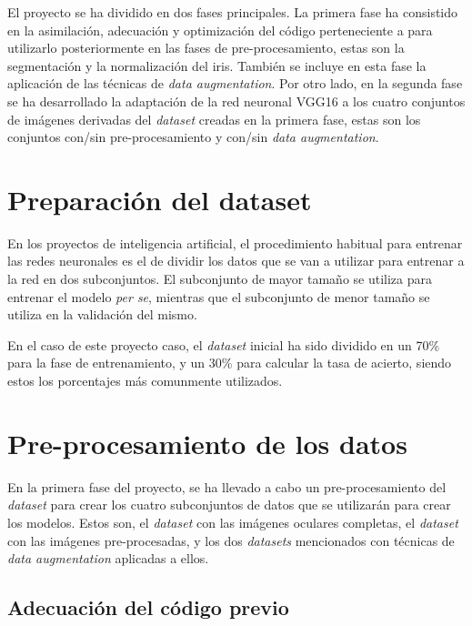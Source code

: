  \label{capitulo5}

El proyecto se ha dividido en dos fases principales. La primera fase ha consistido en la asimilación, adecuación y optimización del código perteneciente
a \cite{tfg_iris_2020} para utilizarlo posteriormente en las fases de pre-procesamiento, estas son la segmentación y la normalización del iris. También se incluye en esta fase la aplicación de las técnicas de \textit{data augmentation}. 
Por otro lado, en la segunda fase se ha desarrollado la adaptación de la red neuronal VGG16 a los cuatro conjuntos de imágenes derivadas del \textit{dataset} creadas en la primera fase, estas son los conjuntos con/sin pre-procesamiento y con/sin \textit{data augmentation}.


\section{Preparación del dataset}

En los proyectos de inteligencia artificial, el procedimiento habitual para entrenar las redes neuronales es el de dividir los datos que se van a utilizar para entrenar a la red en dos subconjuntos. El subconjunto de mayor tamaño se utiliza para entrenar el modelo \emph{per se}, 
mientras que el subconjunto de menor tamaño se utiliza en la validación del mismo. 

En el caso de este proyecto caso, el \textit{dataset} inicial ha sido dividido en un 70\% para la fase de entrenamiento, y un 30\% para calcular la tasa de acierto, siendo estos los porcentajes más comunmente utilizados. 

\section{Pre-procesamiento de los datos}

En la primera fase del proyecto, se ha llevado a cabo un pre-procesamiento del \textit{dataset} para crear los cuatro subconjuntos de datos que se utilizarán para crear los modelos.
Estos son, el \textit{dataset} con las imágenes oculares completas, el \textit{dataset} con las imágenes pre-procesadas, y los dos \textit{datasets} mencionados con técnicas de \textit{data augmentation} aplicadas a ellos.

\subsection{Adecuación del código previo}

